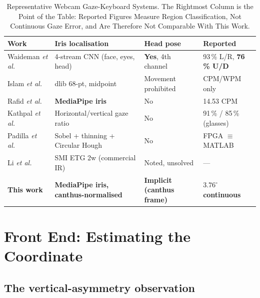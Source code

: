 \documentclass[conference]{IEEEtran}
\begin{document}
\begin{table}[!tb]
\renewcommand{\arraystretch}{1.2}
\caption{Representative Webcam Gaze-Keyboard Systems. The Rightmost Column is
the Point of the Table: Reported Figures Measure Region Classification, Not
Continuous Gaze Error, and Are Therefore Not Comparable With This Work.}
\label{tab:survey}
\centering
\footnotesize
\begin{tabular}{@{}p{2.6cm}p{5.2cm}p{4.0cm}p{4.2cm}@{}}
\toprule
\textbf{Work} & \textbf{Iris localisation} & \textbf{Head pose} &
\textbf{Reported} \\
\midrule
Waideman \emph{et al.}~\cite{ref01} & 4-stream CNN (face, eyes, head) & \textbf{Yes}, 4th channel & 93\,\% L/R, \textbf{76\,\% U/D} \\
Islam \emph{et al.}~\cite{ref02} & dlib 68-pt, midpoint & Movement prohibited & CPM/WPM only \\
Rafid \emph{et al.}~\cite{ref04} & \textbf{MediaPipe iris} & No & 14.53 CPM \\
Kathpal \emph{et al.}~\cite{ref07} & Horizontal/vertical gaze ratio & No & 91\,\% / 85\,\% (glasses) \\
Padilla \emph{et al.}~\cite{ref09} & Sobel + thinning + Circular Hough & No & FPGA $\equiv$ MATLAB \\
Li \emph{et al.}~\cite{ref09b} & SMI ETG 2w (commercial IR) & Noted, unsolved & --- \\
\midrule
\textbf{This work} & \textbf{MediaPipe iris, canthus-normalised} & \textbf{Implicit (canthus frame)} & $\mathbf{3.76^\circ}$ \textbf{continuous} \\
\bottomrule
\end{tabular}
\end{table}

\section{Front End: Estimating the Coordinate}
\label{sec:frontend}

\subsection{The vertical-asymmetry observation}
\end{document}
